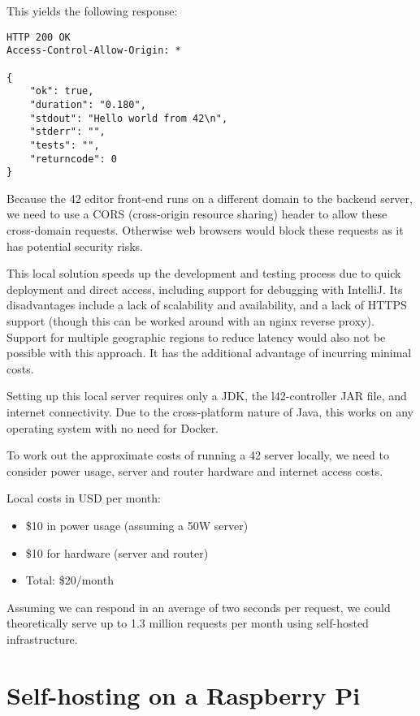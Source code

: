This yields the following response:
\begin{lstlisting}[caption=42 API Response]
HTTP 200 OK
Access-Control-Allow-Origin: *

{
    "ok": true,
    "duration": "0.180",
    "stdout": "Hello world from 42\n",
    "stderr": "",
    "tests": "",
    "returncode": 0
}
\end{lstlisting}

Because the 42 editor front-end runs on a different domain to the backend server, we need to use a CORS (cross-origin resource sharing) header to allow these cross-domain requests. Otherwise web browsers would block these requests as it has potential security risks.

This local solution speeds up the development and testing process due to quick deployment and direct access, including support for debugging with IntelliJ. Its disadvantages include a lack of scalability and availability, and a lack of HTTPS support (though this can be worked around with an nginx reverse proxy). Support for multiple geographic regions to reduce latency would also not be possible with this approach. It has the additional advantage of incurring minimal costs.

Setting up this local server requires only a JDK, the l42-controller JAR file, and internet connectivity. Due to the cross-platform nature of Java, this works on any operating system with no need for Docker.

To work out the approximate costs of running a 42 server locally, we need to consider power usage, server and router hardware and internet access costs.

Local costs in USD per month:

\begin{itemize}
\item \$10 in power usage (assuming a 50W server)
\item \$10 for hardware (server and router)
\item Total: \$20/month
\end{itemize}

Assuming we can respond in an average of two seconds per request, we could theoretically serve up to 1.3 million requests per month using self-hosted infrastructure.

\section{Self-hosting on a Raspberry Pi}

